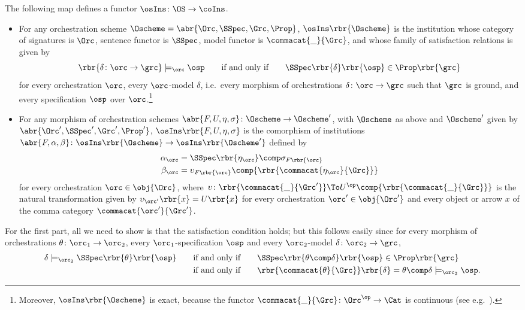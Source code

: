 \documentclass{LMCS}
\begin{document}
  \begin{thm}
    \label{theorem:osIns}
    The following map defines a functor \(\osIns \colon \OS \to \coIns\).
    \begin{itemize}

    \item For any orchestration scheme \(\Oscheme = \abr{\Orc, \SSpec, \Grc, \Prop}\), \(\osIns\rbr{\Oscheme}\) is the institution whose category of signatures is \(\Orc\), sentence functor is \(\SSpec\), model functor is \(\commacat{\_}{\Grc}\), and whose family of satisfaction relations is given by
      \[
      \rbr{\delta \colon \orc \to \grc} \models_{\orc} \osp
      \qquad \text{if and only if} \qquad
      \SSpec\rbr{\delta}\rbr{\osp} \in \Prop\rbr{\grc}
      \]
      for every orchestration \(\orc\), every \(\orc\)\nb-model \(\delta\), i.e.\ every morphism of orchestrations \(\delta \colon \orc \to \grc\) such that \(\grc\) is ground, and every specification \(\osp\) over \(\orc\).\footnote{Moreover, \(\osIns\rbr{\Oscheme}\) is exact, because the functor \(\commacat{\_}{\Grc} \colon \Orc^{\op} \to \Cat\) is continuous (see e.g.~\cite{Meseguer:General-logics-1989}).}

    \item For any morphism of orchestration schemes \(\abr{F, U, \eta, \sigma} \colon \Oscheme \to \Oscheme'\), with \(\Oscheme\) as above and \(\Oscheme'\) given by \(\abr{\Orc', \SSpec', \Grc', \Prop'}\), \(\osIns\rbr{F, U, \eta, \sigma}\) is the comorphism of institutions \(\abr{F, \alpha, \beta} \colon \osIns\rbr{\Oscheme} \to \osIns\rbr{\Oscheme'}\) defined by
      \begin{align*}
        \alpha_{\orc} & = \SSpec\rbr{\eta_{\orc}} \comp \sigma_{F\rbr{\orc}} \\
        \beta_{\orc} & = \upsilon_{F\rbr{\orc}} \comp {\rbr{\commacat{\eta_{\orc}}{\Grc}}}
      \end{align*}
      for every orchestration \(\orc \in \obj{\Orc}\), where \(\upsilon \colon \rbr{\commacat{\_}{\Grc'}} \To U^{\op} \comp {\rbr{\commacat{\_}{\Grc}}}\) is the natural transformation given by \(\upsilon_{\orc'}\rbr{x} = U\rbr{x}\) for every orchestration \(\orc' \in \obj{\Orc'}\) and every object or arrow \(x\) of the comma category \(\commacat{\orc'}{\Grc'}\).

    \end{itemize}
  \end{thm}

  \proof
  For the first part, all we need to show is that the satisfaction condition holds; but this follows easily since for every morphism of orchestrations \(\theta \colon \orc_{1} \to \orc_{2}\), every \(\orc_{1}\)\nb-specification \(\osp\) and every \(\orc_{2}\)\nb-model \(\delta \colon \orc_{2} \to \grc\),
  \begin{align*}
    \delta \models_{\orc_{2}} \SSpec\rbr{\theta}\rbr{\osp}
    & \qquad \text{if and only if} \qquad \SSpec\rbr{\theta \comp \delta}\rbr{\osp} \in \Prop\rbr{\grc} \\
    & \qquad \text{if and only if} \qquad \rbr{\commacat{\theta}{\Grc}}\rbr{\delta} = \theta \comp \delta \models_{\orc_{2}} \osp.
  \end{align*}
\end{document}
